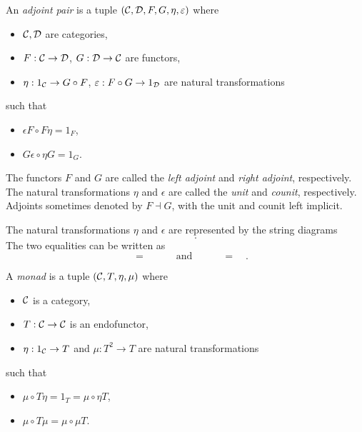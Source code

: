 \documentclass{amsart}
\begin{document}
\begin{definition}
    An \emph{adjoint pair} is a tuple $(\mathcal C, \mathcal D,F,G,\eta,\varepsilon)$
        where
    \begin{itemize}
        \item $\mathcal C,\mathcal D$ are categories,
        \item $F:\mathcal C\to\mathcal D$, $G:\mathcal D\to \mathcal C$ are functors,
        \item $\eta:1_{\mathcal C}\to G\circ F$, $\varepsilon:F\circ G\to 1_{\mathcal D}$
                are natural transformations
    \end{itemize}
        such that
    \begin{itemize}
        \item $\epsilon F\circ F\eta=1_F$,
        \item $G\epsilon \circ \eta G=1_G$.
    \end{itemize}
    The functors $F$ and $G$ are called the \emph{left adjoint} and \emph{right adjoint},
        respectively.
    The natural transformations $\eta$ and $\epsilon$ are called the \emph{unit}
        and \emph{counit}, respectively.
    Adjoints sometimes denoted by $F \dashv G$,
        with the unit and counit left implicit.
\end{definition}
The natural transformations $\eta$ and $\epsilon$ are represented by the string diagrams
\[
    
    \qquad
    
    .
\]
The two equalities can be written as
\[
    
    \quad
    =
    \quad
    
    \qquad
    \text{and}
    \qquad
    
    \quad
    =
    \quad
    
    .
\]
\begin{definition}
    A \emph{monad} is a tuple $(\mathcal C, T, \eta,\mu)$ where
    \begin{itemize}
        \item $\mathcal C$ is a category,
        \item $T:\mathcal C\to \mathcal C$ is an endofunctor,
        \item $\eta:1_{\mathcal C}\to T$ and $\mu:T^2\to T$ are natural transformations
    \end{itemize}
    such that
    \begin{itemize}
        \item $\mu \circ T\eta=1_T = \mu\circ \eta T$,
        \item $\mu\circ T\mu = \mu\circ \mu T$.
    \end{itemize}
\end{definition}
\end{document}
